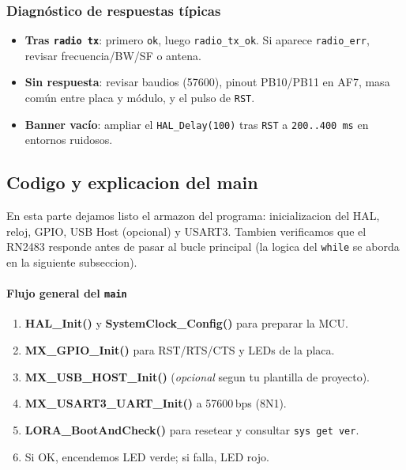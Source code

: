 \documentclass[a4paper,12pt]{article}
\begin{document}
\subsubsection{Diagnóstico de respuestas típicas}
\begin{itemize}
  \item \textbf{Tras \texttt{radio tx}}: primero \texttt{ok}, luego \texttt{radio\_tx\_ok}. Si aparece \texttt{radio\_err}, revisar frecuencia/BW/SF o antena.
  \item \textbf{Sin respuesta}: revisar baudios (57600), pinout PB10/PB11 en AF7, masa común entre placa y módulo, y el pulso de \texttt{RST}.
  \item \textbf{Banner vacío}: ampliar el \texttt{HAL\_Delay(100)} tras \texttt{RST} a \texttt{200..400\,ms} en entornos ruidosos.
\end{itemize}

\subsection{Codigo y explicacion del main}

En esta parte dejamos listo el armazon del programa: inicializacion del HAL, reloj, GPIO, USB Host (opcional) y USART3. Tambien verificamos que el RN2483 responde antes de pasar al bucle principal (la logica del \texttt{while} se aborda en la siguiente subseccion).

\paragraph{Flujo general del \texttt{main}}
\begin{enumerate}
  \item \textbf{HAL\_Init()} y \textbf{SystemClock\_Config()} para preparar la MCU.
  \item \textbf{MX\_GPIO\_Init()} para RST/RTS/CTS y LEDs de la placa.
  \item \textbf{MX\_USB\_HOST\_Init()} (\emph{opcional} segun tu plantilla de proyecto).
  \item \textbf{MX\_USART3\_UART\_Init()} a 57600\,bps (8N1).
  \item \textbf{LORA\_BootAndCheck()} para resetear y consultar \texttt{sys get ver}.
  \item Si OK, encendemos LED verde; si falla, LED rojo.
\end{enumerate}
\newpage
\end{document}
